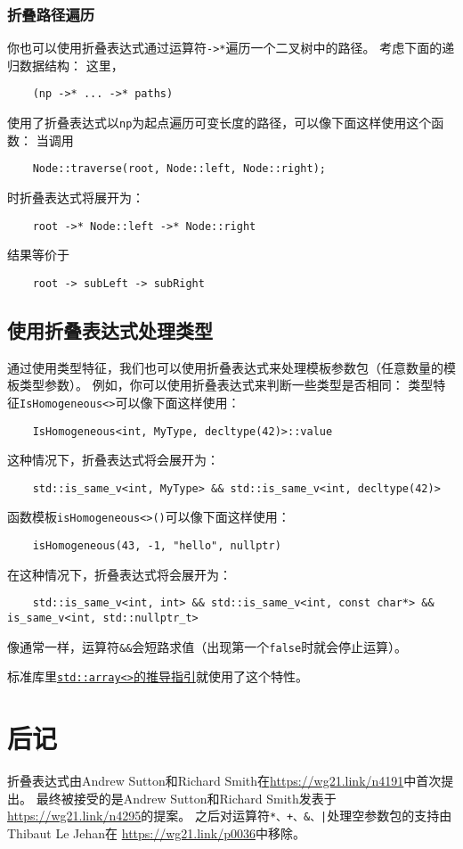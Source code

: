 \subsubsection{折叠路径遍历}
你也可以使用折叠表达式通过运算符\texttt{->*}遍历一个二叉树中的路径。
考虑下面的递归数据结构：
这里，
\begin{lstlisting}
    (np ->* ... ->* paths)
\end{lstlisting}
使用了折叠表达式以\texttt{np}为起点遍历可变长度的路径，可以像下面这样使用这个函数：
当调用
\begin{lstlisting}
    Node::traverse(root, Node::left, Node::right);
\end{lstlisting}
时折叠表达式将展开为：
\begin{lstlisting}
    root ->* Node::left ->* Node::right
\end{lstlisting}
结果等价于
\begin{lstlisting}
    root -> subLeft -> subRight
\end{lstlisting}

\subsection{使用折叠表达式处理类型}
通过使用类型特征，我们也可以使用折叠表达式来处理模板参数包（任意数量的模板类型参数）。
例如，你可以使用折叠表达式来判断一些类型是否相同：
类型特征\texttt{IsHomogeneous<>}可以像下面这样使用：
\begin{lstlisting}
    IsHomogeneous<int, MyType, decltype(42)>::value
\end{lstlisting}
这种情况下，折叠表达式将会展开为：
\begin{lstlisting}
    std::is_same_v<int, MyType> && std::is_same_v<int, decltype(42)>
\end{lstlisting}
函数模板\texttt{isHomogeneous<>()}可以像下面这样使用：
\begin{lstlisting}
    isHomogeneous(43, -1, "hello", nullptr)
\end{lstlisting}
在这种情况下，折叠表达式将会展开为：
\begin{lstlisting}
    std::is_same_v<int, int> && std::is_same_v<int, const char*> && is_same_v<int, std::nullptr_t>
\end{lstlisting}
像通常一样，运算符\texttt{\&\&}会短路求值（出现第一个\texttt{false}时就会停止运算）。

标准库里\hyperref[ch9.2.6.3]{\texttt{std::array<>}的推导指引}就使用了这个特性。

\section{后记}
折叠表达式由Andrew Sutton和Richard Smith在\url{https://wg21.link/n4191}中首次提出。
最终被接受的是Andrew Sutton和Richard Smith发表于\url{https://wg21.link/n4295}的提案。
之后对运算符\texttt{*、+、\&、|}处理空参数包的支持由Thibaut Le Jehan在
\url{https://wg21.link/p0036}中移除。
